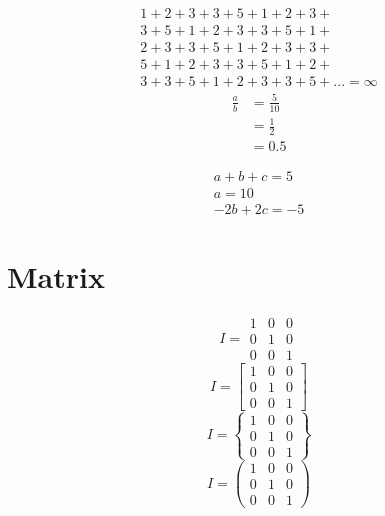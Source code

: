 \documentclass[a4paper, 12pt]{article}
\begin{document}
	\begin{multline}
		1 + 2 + 3 + 3 + 5 + 1 + 2 + 3 + \\
		3 + 5 + 1 + 2 + 3 + 3 + 5 + 1 + \\
		2 + 3 + 3 + 5 + 1 + 2 + 3 + 3 + \\
		5 + 1 + 2 + 3 + 3 + 5 + 1 + 2 + \\
		3 + 3 + 5 + 1 + 2 + 3 + 3 + 5 + ... = \infty
	\end{multline}
	\begin{equation}
		\begin{split}
			\frac{a}{b} &= \frac{5}{10} \\
						&= \frac{1}{2} \\
						&= 0.5
		\end{split}
	\end{equation}
	
	\begin{gather}
		a + b + c = 5 \\
		a = 10 \\
		- 2b + 2c = -5
	\end{gather}
	
	\section{Matrix}
	\begin{equation*}
		I = \begin{matrix}
			1 & 0 & 0 \\
			0 & 1 & 0 \\
			0 & 0 & 1
		\end{matrix}
	\end{equation*}
	\begin{equation*}
		I = \begin{bmatrix}
			1 & 0 & 0 \\
			0 & 1 & 0 \\
			0 & 0 & 1
		\end{bmatrix}
	\end{equation*}
	\begin{equation*}
		I = \begin{Bmatrix}
			1 & 0 & 0 \\
			0 & 1 & 0 \\
			0 & 0 & 1
		\end{Bmatrix}
	\end{equation*}
	\begin{equation*}
		I = \begin{pmatrix}
			1 & 0 & 0 \\
			0 & 1 & 0 \\
			0 & 0 & 1
		\end{pmatrix}
	\end{equation*}
\end{document}
